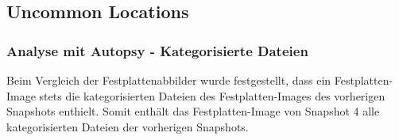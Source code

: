 \begin{appendices}

\subsection{Uncommon Locations}
\label{subsection:appendix-firefox-uncommon-locations}

\subsubsection*{Analyse mit Autopsy - Kategorisierte Dateien}
\label{subsubsection:appendix-firefox-uncommon-locations-autopsy}

Beim Vergleich der Festplattenabbilder wurde festgestellt, dass ein Festplatten-Image stets die kategorisierten Dateien des Festplatten-Images des vorherigen Snapshots enthielt. Somit enthält das Festplatten-Image von Snapshot 4 alle kategorisierten Dateien der vorherigen Snapshots.


\end{appendices}

